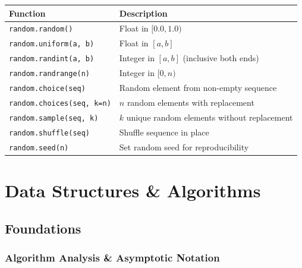 \documentclass[oneside]{book}
\begin{document}
\begin{center}
\begin{tabularx}{\linewidth}{lX}
\toprule
\textbf{Function} & \textbf{Description} \\
\midrule
\texttt{random.random()}          & Float in $[0.0, 1.0)$ \\
\texttt{random.uniform(a, b)}     & Float in $[a, b]$ \\
\texttt{random.randint(a, b)}     & Integer in $[a, b]$ (inclusive both ends) \\
\texttt{random.randrange(n)}      & Integer in $[0, n)$ \\
\texttt{random.choice(seq)}       & Random element from non-empty sequence \\
\texttt{random.choices(seq, k=n)} & $n$ random elements with replacement \\
\texttt{random.sample(seq, k)}    & $k$ unique random elements without replacement \\
\texttt{random.shuffle(seq)}      & Shuffle sequence in place \\
\texttt{random.seed(n)}           & Set random seed for reproducibility \\
\bottomrule
\end{tabularx}
\end{center}

\part{Data Structures \& Algorithms}

\chapter{Foundations}

\section{Algorithm Analysis \& Asymptotic Notation}

\end{document}

